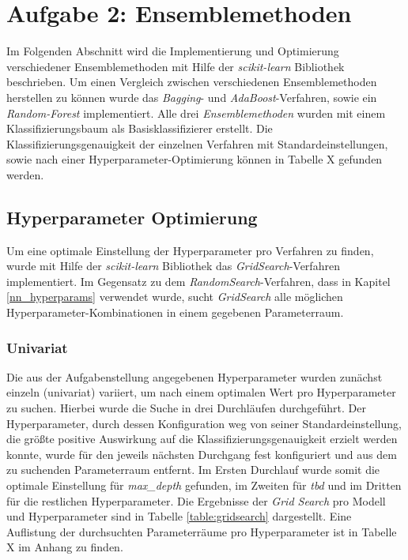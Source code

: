 \pagebreak
\section{Aufgabe 2: Ensemblemethoden}
Im Folgenden Abschnitt wird die Implementierung und Optimierung verschiedener Ensemblemethoden mit Hilfe der \emph{scikit-learn} Bibliothek beschrieben. Um einen Vergleich zwischen verschiedenen Ensemblemethoden herstellen zu können wurde das \emph{Bagging}- und \emph{AdaBoost}-Verfahren, sowie ein \emph{Random-Forest} implementiert. Alle drei \emph{Ensemblemethoden} wurden mit einem Klassifizierungsbaum als Basisklassifizierer erstellt. Die Klassifizierungsgenauigkeit der einzelnen Verfahren mit Standardeinstellungen, sowie nach einer Hyperparameter-Optimierung können in Tabelle X gefunden werden. 

\subsection{Hyperparameter Optimierung}
Um eine optimale Einstellung der Hyperparameter pro Verfahren zu finden, wurde mit Hilfe der \emph{scikit-learn} Bibliothek das \emph{GridSearch}-Verfahren implementiert. Im Gegensatz zu dem \emph{RandomSearch}-Verfahren, dass in Kapitel \ref{nn_hyperparams} verwendet wurde, sucht \emph{GridSearch} alle möglichen Hyperparameter-Kombinationen in einem gegebenen Parameterraum. 

\subsubsection{Univariat}
Die aus der Aufgabenstellung angegebenen Hyperparameter wurden zunächst einzeln (univariat) variiert, um nach einem optimalen Wert pro Hyperparameter zu suchen. Hierbei wurde die Suche in drei Durchläufen durchgeführt. Der Hyperparameter, durch dessen Konfiguration weg von seiner Standardeinstellung, die größte positive Auswirkung auf die Klassifizierungsgenauigkeit erzielt werden konnte, wurde für den jeweils nächsten Durchgang fest konfiguriert und aus dem zu suchenden Parameterraum entfernt. Im Ersten Durchlauf wurde somit die optimale Einstellung für \emph{max\_depth} gefunden, im Zweiten für \emph{tbd} und im Dritten für die restlichen Hyperparameter. Die Ergebnisse der \emph{Grid Search} pro Modell und Hyperparameter sind in Tabelle \ref{table:gridsearch} dargestellt. Eine Auflistung der durchsuchten Parameterräume pro Hyperparameter ist in Tabelle X im Anhang zu finden.

